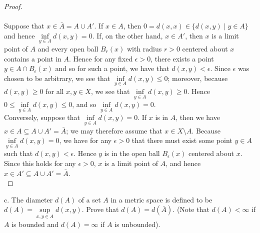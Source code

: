 \begin{proof}\ \\\\
    Suppose that $x \in \bar {A} = A \cup A'$. If $x \in A$, then $0 = d(x, x) \in \{ d(x, y) \mid y \in A\}$ and hence
    $\inf\limits_{y \in A}{d(x, y)} = 0$. If, on the other hand, $x \in A'$, then $x$ is a limit point of $A$ and every
    open ball $B_r(x)$ with radius $r > 0$ centered about $x$ contains a point in $A$. Hence for any fixed 
    $\epsilon > 0$, there exists a point $y \in A \cap B_{\epsilon}(x)$ and so for such a point, we have that 
    $d(x, y) < \epsilon$.  Since $\epsilon$ was chosen to be arbitrary, we see that 
    $\inf\limits_{y \in A}{d(x, y)} \le 0$; moreover, because $d(x, y) \ge 0$ for all $x, y \in X$, we see that 
    $\inf\limits_{y \in A}{d(x, y)} \ge 0$. Hence $0 \le \inf\limits_{y \in A}{d(x, y)} \le 0$, and so
    $\inf\limits_{y \in A}{d(x, y)} = 0$. \ \\

    Conversely, suppose that $\inf\limits_{y \in A}{d(x, y)} = 0$. If $x$ is in $A$, then we have 
    $x \in A \subseteq A \cup A' = \bar{A}$; we may therefore assume that $x \in X \setminus A$. Because 
    $\inf\limits_{y \in A}{d(x, y)} = 0$, we have for any $\epsilon > 0$ that there must exist some point $y \in A$ such
    that $d(x, y) < \epsilon$. Hence $y$ is in the open ball $B_{\epsilon}(x)$ centered about $x$. Since this holds for 
    any $\epsilon > 0$, $x$ is a limit point of $A$, and hence $x \in A' \subseteq A \cup A' = \bar{A}$.
    \ \\
\end{proof}

\pagebreak

c.  The diameter $d(A)$ of a set $A$ in a metric space is defined to be $d(A) = \sup\limits_{x,y \in A}{d(x, y)}$. Prove
    that $d(A) = d(\bar{A})$. (Note that $d(A) < \infty$ if $A$ is bounded and $d(A) = \infty$ if $A$ is unbounded).

